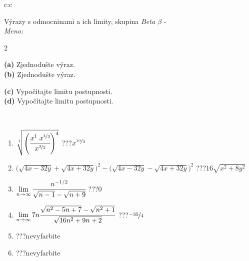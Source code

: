 \documentclass[10pt]{report}
\begin{document}
\begin{tabular}{c:c}
\begin{minipage}[c][104.5mm][t]{0.5\linewidth}
\begin{center}
\vspace{7mm}
{\huge {\Large Výrazy s odmocninami a ich limity}, skupina \textit{Beta $\beta$} -}\\[5mm]
\textit{Meno:}\phantom{xxxxxxxxxxxxxxxxxxxxxxxxxxxxxxxxxxxxxxxxxxxxxxxxxxxxxxxxxxxxxxxxx}\\[5mm]
\begin{minipage}{0.95\linewidth}
\begin{center}
{\small \begin{multicols}{2} \raggedright
\phantom{xxxxxxxxx}\textbf{(a)} Zjednodušte výraz. \\[1mm]
\phantom{xxxxxxxxx}\textbf{(b)} Zjednodušte výraz. \par \columnbreak
\textbf{(c)} Vypočítajte limitu postupnosti. \\[1mm]
\textbf{(d)} Vypočítajte limitu postupnosti.
\end{multicols}
}
\end{center}
\end{minipage}
\\[4mm]
\begin{minipage}{0.79\linewidth}
\begin{center}
\begin{varwidth}{\linewidth}
\begin{enumerate}
\small
\item $\sqrt[1]{\left(\cfrac{x^{1}\;x^{\nicefrac{4}{3}}}{x^{\nicefrac{3}{2}}}\right)^{4}}$\quad \dotfill\; ???\;\dotfill \quad $x^{\nicefrac{10}{3}}$
\item {\footnotesize{\scriptsize$\big(\sqrt{4x-32y}+\sqrt{4x+32y}\big)^2-\big(\sqrt{4x-32y}-\sqrt{4x+32y}\big)^2$}\quad \dotfill\; ???\;\dotfill \quad $16\sqrt{x^2+8y^2}$}
\item $\lim\limits_{n\to\infty}\cfrac{n^{-1/2}}{\sqrt{n-1}-\sqrt{n+9}}$\quad \dotfill\; ???\;\dotfill \quad $0$
\item $\lim\limits_{n\to\infty}7n\cfrac{\sqrt{n^2-5n+7}-\sqrt{n^2+1}}{\sqrt{16n^2+9n+2}}$\quad \dotfill\; ???\;\dotfill \quad $\nicefrac{-35}{4}$
\item \quad \dotfill\; ???\;\dotfill \quad nevyfarbite
\item \quad \dotfill\; ???\;\dotfill \quad nevyfarbite
\end{enumerate}
\end{varwidth}

\end{center}
\end{minipage}
\end{center}
\end{minipage}
\end{tabular}
\end{document}
